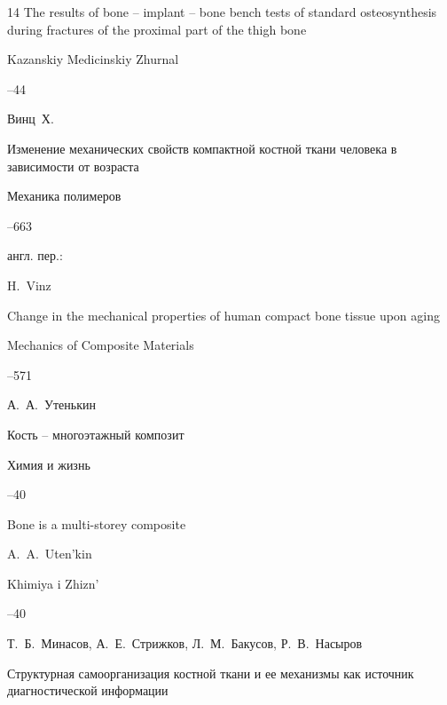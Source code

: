 \begin{thebibliography}{14}
\paper The results of bone – implant – bone bench tests of standard osteosynthesis during fractures of the proximal part of the thigh bone

\jour  Kazanskiy Medicinskiy Zhurnal




–44




\by Винц~Х.

\paper Изменение механических свойств компактной костной ткани человека в зависимости от возраста

\jour Механика полимеров



--663

\transl англ. пер.:~

\by H.~Vinz 

\paper Change in the mechanical properties of human compact bone tissue upon aging

\jour Mechanics of Composite Materials




–571




\by А.~А.~Утенькин

\paper Кость – многоэтажный композит

\jour Химия и жизнь



--40

\misctransl

\paper  Bone is a multi-storey composite

\by A.~A.~Uten'kin 

\jour Khimiya i Zhizn' 



--40




\by Т.~Б.~Минасов, А.~Е.~Стрижков, Л.~М.~Бакусов, Р.~В.~Насыров

\book Структурная самоорганизация костной ткани и ее механизмы как источник диагностической информации


\end{thebibliography}
